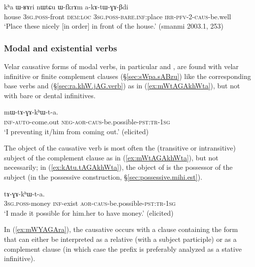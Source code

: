 \begin{exe}
\ex \label{ex:akAtWGABdi}
\gll  kʰa ɯ-ʁɤri nɯtɕu ɯ-fkrɤm a-kɤ-tɯ-ɣɤ-βdi \\
house \textsc{3sg}.\textsc{poss}-front \textsc{dem}:\textsc{loc} \textsc{3sg}.\textsc{poss}-\textsc{bare}.\textsc{inf}:place \textsc{irr}-\textsc{pfv}-2-\textsc{caus}-be.well \\
\glt `Place these nicely [in order] in front of the house.' (smanmi 2003.1, 253)
\end{exe}

\subsubsection{Modal and existential verbs} \label{sec:velar.caus.modal}
Velar causative forms of modal verbs, in particular  and  , are found with velar infinitive or finite complement clauses (§\ref{sec:sWpa.sABzu}) like the corresponding base verbs  and  (§\ref{sec:ra.khW.jAG.verb}) as in (\ref{ex:mWtAGAkhWta}), but not with bare or dental infinitives.

\begin{exe}
\ex \label{ex:mWtAGAkhWta}
\gll  [kɤ-nɯ-ɬoʁ] mɯ-tɤ-ɣɤ-kʰɯ-t-a. \\
  \textsc{inf}-\textsc{auto}-come.out \textsc{neg}-\textsc{aor}-\textsc{caus}-be.possible-\textsc{pst}:\textsc{tr}-\textsc{1sg} \\
\glt `I preventing it/him from coming out.' (elicited)
\end{exe}

The object of the causative verb is most often the (transitive or intransitive) subject of the complement clause as in (\ref{ex:mWtAGAkhWta}), but not necessarily; in (\ref{ex:kAtu.tAGAkhWta}), the object of  is the possessor of the subject (in the possessive construction, §\ref{sec:possessive.mihi.est}).

\begin{exe}
\ex \label{ex:kAtu.tAGAkhWta}
\gll [ɯ-rŋɯl kɤ-tu] tɤ-ɣɤ-kʰɯ-t-a. \\
\textsc{3sg}.\textsc{poss}-money \textsc{inf}-exist \textsc{aor}-\textsc{caus}-be.possible-\textsc{pst}:\textsc{tr}-\textsc{1sg} \\
\glt `I made it possible for him.her to have money.'  (elicited)
\end{exe}

In (\ref{ex:mWYAGAra}), the causative  occurs with a clause containing the form  that can either be interpreted as a relative (with a subject participle) or as a complement clause (in which case the  prefix is preferably analyzed as a stative infinitive).

